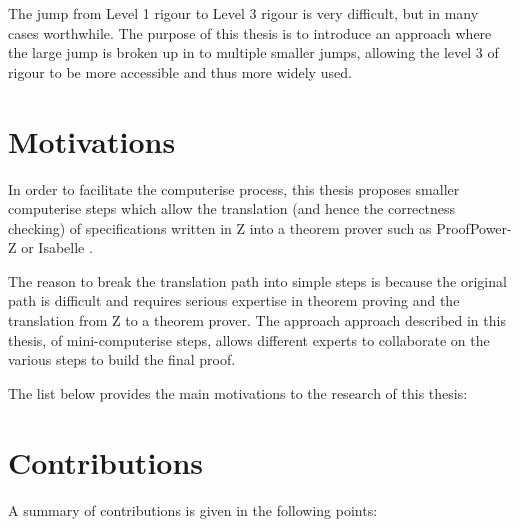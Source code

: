 The jump from Level 1 rigour to Level 3 rigour is very difficult, but in many cases worthwhile. The purpose of this thesis is to introduce an approach where the large jump is broken up in to multiple smaller jumps, allowing the level 3 of rigour to be more accessible and thus more widely used. 

\section{Motivations}

In order to facilitate the \gls{computerise} process, this thesis proposes smaller \gls{computerise} steps which allow the translation (and hence the correctness checking) of specifications written in Z into a theorem prover such as ProofPower-Z \cite{pp} or Isabelle \cite{isabelle}.

The reason to break the translation path into simple steps is because the original path is difficult and requires serious expertise in theorem proving and the translation from Z to a theorem prover. The approach approach described in this thesis, of mini-\gls{computerise} steps, allows different experts to collaborate on the various steps to build the final proof.

The list below provides the main motivations to the research of this thesis:

\section{Contributions}

A summary of contributions is given in the following points:

